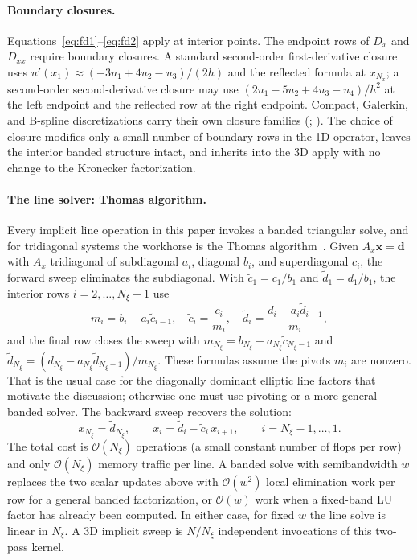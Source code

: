 \documentclass[11pt]{article}
\newcommand{\Dx}{D_{x}}
\newcommand{\Dxx}{D_{xx}}
\newcommand{\Ax}{A_{x}}
\newcommand{\bigO}{\mathcal{O}}
\newcommand{\Nall}{N}
\begin{document}
\paragraph{Boundary closures.}
Equations~\eqref{eq:fd1}--\eqref{eq:fd2} apply at interior points.
The endpoint rows of $\Dx$ and $\Dxx$ require boundary closures.  A
standard second-order first-derivative closure uses
$u'(x_1) \approx (-3 u_1 + 4 u_2 - u_3)/(2h)$ and the reflected
formula at $x_{N_x}$; a second-order second-derivative closure may use
$(2u_1-5u_2+4u_3-u_4)/h^2$ at the left endpoint and the reflected
row at the right endpoint.  Compact, Galerkin, and B-spline
discretizations carry their own closure families
(\citealp{lele1992compact}; \citealp{deboor1978practical}).  The
choice of closure modifies only a small number of boundary rows in
the 1D operator, leaves the interior banded structure intact, and
inherits into the 3D apply with no change to the Kronecker
factorization.

\paragraph{The line solver: Thomas algorithm.}
Every implicit line operation in this paper invokes a banded triangular
solve, and for tridiagonal systems the workhorse is the Thomas
algorithm~\citep{thomas1949elliptic}.  Given $\Ax\bm{x} = \bm{d}$
with $\Ax$ tridiagonal of subdiagonal $a_i$, diagonal $b_i$, and
superdiagonal $c_i$, the forward sweep eliminates the subdiagonal.
With $\tilde c_1=c_1/b_1$ and $\tilde d_1=d_1/b_1$, the interior rows
$i=2,\ldots,N_\xi-1$ use
\begin{equation}
\label{eq:thomas-fwd}
  m_i = b_i-a_i\tilde c_{i-1},\quad
  \tilde c_i = \frac{c_i}{m_i},\quad
  \tilde d_i = \frac{d_i-a_i\tilde d_{i-1}}{m_i},
\end{equation}
and the final row closes the sweep with
$m_{N_\xi} = b_{N_\xi}-a_{N_\xi}\tilde c_{N_\xi-1}$ and
$\tilde d_{N_\xi} = (d_{N_\xi}-a_{N_\xi}\tilde d_{N_\xi-1})/m_{N_\xi}$.
These formulas assume the pivots $m_i$ are nonzero.  That is the
usual case for the diagonally dominant elliptic line factors that
motivate the discussion; otherwise one must use pivoting or a more
general banded solver.
The backward sweep recovers the solution:
\begin{equation}
\label{eq:thomas-bwd}
  x_{N_\xi} = \tilde d_{N_\xi},
  \qquad
  x_i = \tilde d_i - \tilde c_i\, x_{i+1},
  \qquad
  i = N_\xi-1, \ldots, 1.
\end{equation}
The total cost is $\bigO(N_\xi)$ operations (a small constant number
of flops per row) and only $\bigO(N_\xi)$ memory traffic per line.  A
banded solve with semibandwidth $w$ replaces the two scalar updates
above with $\bigO(w^2)$ local elimination work per row for a general
banded factorization, or $\bigO(w)$ work when a fixed-band LU factor
has already been computed.  In either case, for fixed $w$ the line
solve is linear in $N_\xi$.  A 3D implicit sweep is
$\Nall/N_\xi$ independent invocations of this two-pass kernel.
\end{document}
